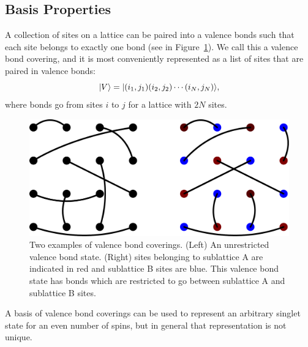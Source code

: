\subsection{Basis Properties}
A collection of sites on a lattice can be paired into a valence bonds such that each site
belongs to exactly one bond (see in Figure~\ref{covering}).  
We call this a valence bond covering, and it is most conveniently represented as a list of 
sites that are paired in valence bonds:
\begin{equation}
	\lvert {V} \rangle = \lvert {(i_1,j_1)(i_2,j_2)\cdots(i_N,j_N)} \rangle,
\end{equation}
where bonds go from sites $i$ to $j$ for a lattice with $2N$ sites.  


\begin{figure} { \includegraphics [width=5.5in]
{./figures/made/coverings.pdf}
\centering
 \caption[Two valence bond coverings]{
	Two examples of valence bond coverings.  (Left) An unrestricted valence bond state.
	(Right) sites belonging to sublattice A are indicated in red and sublattice B sites are blue.   	 	This valence bond state has bonds which are restricted to go 
	between sublattice A and sublattice B sites.  
 }
 }
\label{covering}
\end{figure}
 
A basis of valence bond coverings can be used to represent an arbitrary singlet state
for an even number of spins, but in general that representation is not unique.

